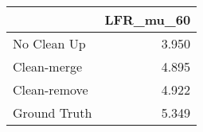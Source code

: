 \begin{tabular}{lr}
\toprule
{} & LFR_mu_60 \\
\midrule
No Clean Up  &     3.950 \\
Clean-merge  &     4.895 \\
Clean-remove &     4.922 \\
Ground Truth &     5.349 \\
\bottomrule
\end{tabular}
